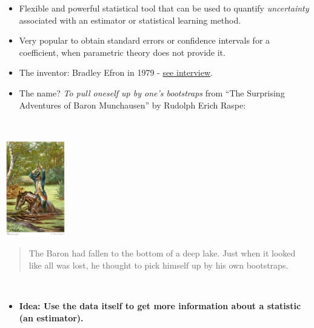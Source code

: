 \documentclass[
  10pt,
  ignorenonframetext,
]{beamer}
\providecommand{\tightlist}{%
  \setlength{\itemsep}{0pt}\setlength{\parskip}{0pt}}
\begin{document}
\begin{frame}
\vspace{2mm}

\begin{itemize}
\tightlist
\item
  Flexible and powerful statistical tool that can be used to quantify
  \emph{uncertainty} associated with an estimator or statistical
  learning method.
\end{itemize}

\vspace{2mm}

\begin{itemize}
\tightlist
\item
  Very popular to obtain standard errors or confidence intervals for a
  coefficient, when parametric theory does not provide it.
\end{itemize}

\vspace{2mm}

\begin{itemize}
\tightlist
\item
  The inventor: Bradley Efron in 1979 -
  \href{https://www.youtube.com/watch?v=6l9V1sINzhE}{see interview}.
\end{itemize}
\end{frame}

\begin{frame}
\begin{itemize}
\tightlist
\item
  The name? \emph{To pull oneself up by one's bootstraps} from ``The
  Surprising Adventures of Baron Munchausen'' by Rudolph Erich Raspe:
\end{itemize}

\(~\)

\includegraphics[width=0.2\textwidth,height=\textheight]{muenchhausen}

\begin{quote}
The Baron had fallen to the bottom of a deep lake. Just when it looked
like all was lost, he thought to pick himself up by his own bootstraps.
\end{quote}

\(~\)

\begin{itemize}
\tightlist
\item
  \textbf{Idea: Use the data itself to get more information about a
  statistic (an estimator).}
\end{itemize}
\end{frame}
\end{document}
